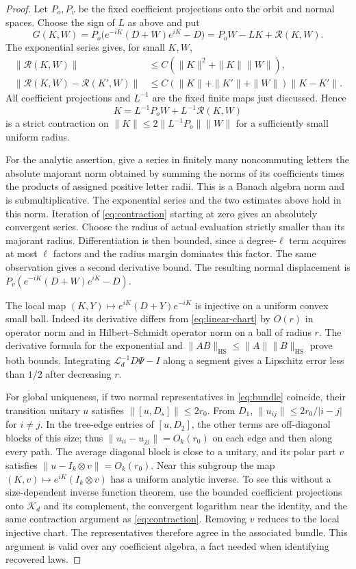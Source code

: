 \documentclass[11pt]{article}
\theoremstyle{definition}\newtheorem{definition}[theorem]{Definition}
\theoremstyle{remark}\newtheorem{remark}[theorem]{Remark}
\newcommand{\HS}{\mathrm{HS}}\newcommand{\op}{\mathrm{op}}
\begin{document}
\begin{proof}
Let $P_o,P_v$ be the fixed coefficient projections onto the orbit and
normal spaces. Choose the sign of $L$ as above and put
\[
 G(K,W)=P_o\big(e^{-iK}(D+W)e^{iK}-D\big)
       =P_oW-LK+\mathcal R(K,W).
\]
The exponential series gives, for small $K,W$,
\begin{align*}
 \|\mathcal R(K,W)\|&\leq C(\|K\|^2+\|K\|\|W\|),\\
 \|\mathcal R(K,W)-\mathcal R(K',W)\|
 &\leq C(\|K\|+\|K'\|+\|W\|)\|K-K'\|.
\end{align*}
All coefficient projections and $L^{-1}$ are the fixed finite maps
just discussed. Hence
\begin{equation}\label{eq:contraction}
 K=L^{-1}P_oW+L^{-1}\mathcal R(K,W)
\end{equation}
is a strict contraction on
$\|K\|\leq2\|L^{-1}P_o\|\|W\|$ for a sufficiently small uniform
radius.

For the analytic assertion, give a series in finitely many
noncommuting letters the absolute majorant norm obtained by summing
the norms of its coefficients times the products of assigned positive
letter radii. This is a Banach algebra norm and is submultiplicative.
The exponential series and the two estimates above hold in this norm.
Iteration of \eqref{eq:contraction} starting at zero gives an absolutely
convergent series. Choose the radius of actual evaluation strictly
smaller than its majorant radius. Differentiation is then bounded,
since a degree-$\ell$ term acquires at most $\ell$ factors and the
radius margin dominates this factor. The same observation gives a
second derivative bound. The resulting normal displacement is
$P_v(e^{-iK}(D+W)e^{iK}-D)$.

The local map $(K,Y)\mapsto e^{iK}(D+Y)e^{-iK}$ is injective on a
uniform convex small ball. Indeed its derivative differs from
\eqref{eq:linear-chart} by $O(r)$ in operator norm and in
Hilbert--Schmidt operator norm on a ball of radius $r$. The derivative
formula for the exponential and
$\|AB\|_{\HS}\leq\|A\|\|B\|_{\HS}$ prove both bounds.
Integrating $\mathcal L_d^{-1}D\Psi-I$ along a segment gives a
Lipschitz error less than $1/2$ after decreasing $r$.

For global uniqueness, if two normal representatives in
\eqref{eq:bundle} coincide, their transition unitary $u$ satisfies
$\|[u,D_s]\|\leq2r_0$. From $D_1$,
$\|u_{ij}\|\leq2r_0/|i-j|$ for $i\ne j$. In the tree-edge entries
of $[u,D_2]$, the other terms are off-diagonal blocks of this size;
thus $\|u_{ii}-u_{jj}\|=O_k(r_0)$ on each edge and then along every
path. The average diagonal block is close to a unitary, and its polar
part $v$ satisfies $\|u-I_k\otimes v\|=O_k(r_0)$.
Near this subgroup the map $(K,v)\mapsto e^{iK}(I_k\otimes v)$ has a
uniform analytic inverse. To see this without a size-dependent inverse
function theorem, use the bounded coefficient projections onto
$\mathcal K_d$ and its complement, the convergent logarithm near the
identity, and the same contraction argument as \eqref{eq:contraction}.
Removing $v$ reduces to the local injective chart. The representatives
therefore agree in the associated bundle. This argument is valid over
any coefficient algebra, a fact needed when identifying recovered laws.


\end{proof}
\end{document}
